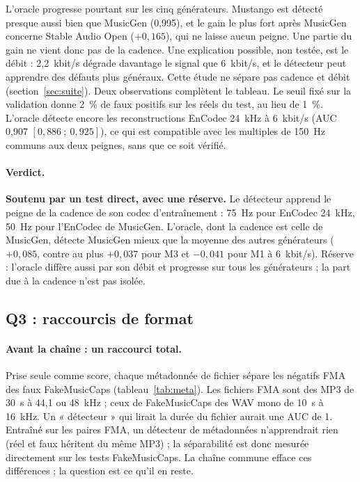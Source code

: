 \documentclass[a4paper, 11pt]{article}
\begin{document}
L'oracle progresse pourtant sur les cinq générateurs. Mustango est détecté presque aussi bien que MusicGen
(0,995), et le gain le plus fort après MusicGen concerne Stable Audio Open ($+0{,}165$), qui ne laisse aucun
peigne. Une partie du gain ne vient donc pas de la cadence. Une explication possible, non testée, est le débit :
2,2~kbit/s dégrade davantage le signal que 6~kbit/s, et le détecteur peut apprendre des défauts plus généraux.
Cette étude ne sépare pas cadence et débit (section~\ref{sec:suite}). Deux observations complètent le tableau.
Le seuil fixé sur la validation donne 2~\% de faux positifs sur les réels du test, au lieu de 1~\%. L'oracle
détecte encore les reconstructions EnCodec 24~kHz à 6~kbit/s (AUC 0,907 $[0{,}886~;~0{,}925]$), ce qui est
compatible avec les multiples de 150~Hz communs aux deux peignes, sans que ce soit vérifié.

\paragraph{Verdict.} \textbf{Soutenu par un test direct, avec une réserve.} Le détecteur apprend le peigne de
la cadence de son codec d'entraînement : 75~Hz pour EnCodec 24~kHz, 50~Hz pour l'EnCodec de MusicGen.
L'oracle, dont la cadence est celle de MusicGen, détecte MusicGen mieux que la moyenne des autres générateurs
($+0{,}085$, contre au plus $+0{,}037$ pour M3 et $-0{,}041$ pour M1 à 6~kbit/s).
Réserve : l'oracle diffère aussi par son débit et progresse sur tous les générateurs ; la part due à la cadence
n'est pas isolée.

\subsection{Q3 : raccourcis de format}

\paragraph{Avant la chaîne : un raccourci total.} Prise seule comme score, chaque métadonnée de fichier sépare
les négatifs FMA des faux FakeMusicCaps (tableau~\ref{tab:meta}). Les fichiers FMA sont des MP3 de 30~s à 44,1
ou 48~kHz ; ceux de FakeMusicCaps des WAV mono de 10~s à 16~kHz. Un « détecteur » qui lirait la durée du fichier
aurait une AUC de 1. Entraîné sur les paires FMA, un détecteur de métadonnées n'apprendrait rien (réel et faux
héritent du même MP3) ; la séparabilité est donc mesurée directement sur les tests FakeMusicCaps. La chaîne
commune efface ces différences ; la question est ce qu'il en reste.
\end{document}
